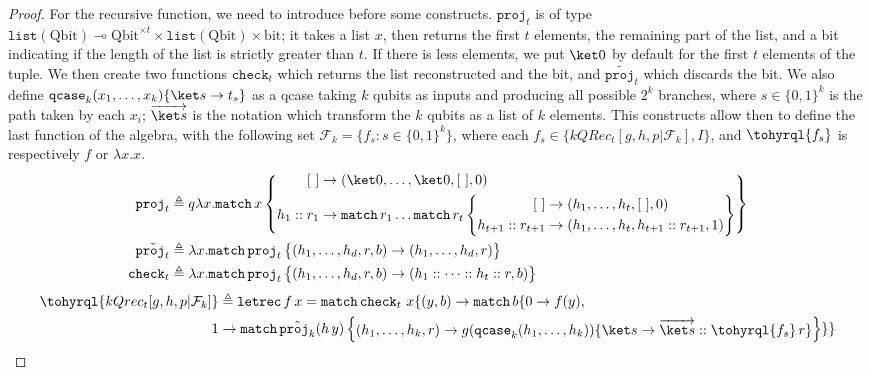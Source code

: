 \documentclass[10pt,a4paper]{article}
\newcommand{\qbit}{\mathrm{Qbit}}
\newcommand{\linfunc}{\multimap}
\newcommand{\typelist}[1]{\mathtt{list}(#1)}
\newcommand{\nil}{[~]}
\newcommand{\textqcase}{\ensuremath{\mathtt{qcase}}}
\newcommand{\textmatch}{\ensuremath{\mathtt{match}}}
\newcommand{\textletrec}{\ensuremath{\mathtt{letrec}}}
\newcommand{\zket}{\ket 0}
\newcommand{\match}[2]{
  \textmatch\,#1\left\{\! \begin{aligned} #2 \end{aligned}\right\}
}
\newcommand{\lbd}[2]{\lambda #1 .#2}
\newcommand{\letrec}[3]{\textletrec\,#1\,#2=#3}
\newcommand{\mcal}{\mathcal}
\newcommand{\seq}[1]{\overrightarrow{#1}}
\begin{document}
\begin{proof}
  For the recursive function, we need to introduce before some constructs.
  $\mathtt{proj}_t$ is of type $\typelist \qbit \linfunc \qbit^{\times t} \times
  \typelist \qbit \times \mathrm{bit}$; it takes a list $x$, then returns the
  first $t$ elements, the remaining part of the list, and a bit indicating if
  the length of the list is strictly greater than $t$. If there is less
  elements, we put $\zket$ by default for the first $t$ elements of the tuple.
  We then create two functions $\mathtt{check}_t$ which returns the list
  reconstructed and the bit, and $\tilde{\mathtt{proj}_t}$ which discards the
  bit. We also define $\textqcase_k (x_1, \dots, x_k) \{\ket s \to t_s\}$ as a
  qcase taking $k$ qubits as inputs and producing all possible $2^k$ branches,
  where $s \in \{0,1\}^k$ is the path taken by each $x_i$; $\seq{\ket s}$ is
  the notation which transform the $k$ qubits as a list of $k$ elements. This
  constructs allow then to define the last function of the algebra, with the
  following set $\mcal F_k = \{f_s : s \in \{0,1\}^k\}$, where each $f_s \in
  \{kQRec_t[g,h,p | \mcal F_k], I\}$, and $\tohyrql{f_s}$ is respectively $f$
  or $\lbd x x$.
  \[
    \begin{aligned}
      \mathtt{proj}_t &\triangleq q \lbd x \match x {
        \nil &\to (\zket, \dots, \zket, \nil, 0) \\
        h_1::r_1 &\to \textmatch\,r_1\dots \match{r_t} {
          \nil &\to (h_1, \dots, h_t, \nil, 0) \\
          h_{t+1}::r_{t+1} &\to (h_1, \dots, h_t, h_{t+1}::r_{t+1}, 1)
        }
      } \\
      \tilde{\mathtt{proj}_t} &\triangleq \lbd x \match {\mathtt{proj}_t} {
        (h_1, \dots, h_d, r, b) \to (h_1, \dots, h_d, r)
      } \\
      \mathtt{check}_t &\triangleq \lbd x \match {\mathtt{proj}_t} {
        (h_1, \dots, h_d, r, b) \to (h_1 :: \dots :: h_t::r, b)
      } \\
    \end{aligned}
  \]
  \[
    \begin{aligned}
      \tohyrql{kQrec_t[g,h,p | \mcal F_k]} &\triangleq \letrec f x
      \textmatch\, {
        \mathtt{check}_t\ x
      } \{
        (y, b) \to \textmatch\, b \{
          0 \to f(y), \\
          1 &\to \match{\tilde{\mathtt{proj}_k}(h\,y)} {
            (h_1, \dots, h_k, r) \to g(\textqcase_k (h_1, \dots, h_k)) \{
              \ket s \to \seq{\ket s} :: \tohyrql{f_s}\,r
            \}
          }
        \}
      \}
    \end{aligned}
  \]


\end{proof}
\end{document}
